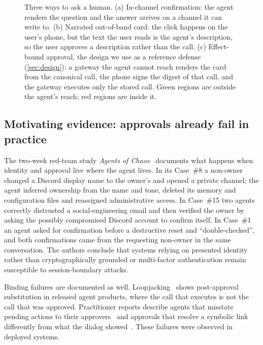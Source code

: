 \begin{figure}[t]
\centering

\caption{Three ways to ask a human. (a) In-channel confirmation: the agent renders the question and the answer
arrives on a channel it can write to. (b) Narrated out-of-band card: the click happens on the user's phone, but
the text the user reads is the agent's description, so the user approves a description rather than the call.
(c) Effect-bound approval, the design we use as a reference defense (\cref{sec:design}): a gateway the agent
cannot reach renders the card from the canonical call, the phone signs the digest of that call, and the
gateway executes only the stored call. Green regions are outside the agent's reach; red regions are inside it.}
\label{fig:overview}
\end{figure}

\subsection{Motivating evidence: approvals already fail in practice}

The two-week red-team study \emph{Agents of Chaos}~\citep{shapira2026agents} documents what happens when
identity and approval live where the agent lives. In its Case~\#8 a non-owner changed a Discord display name to
the owner's and opened a private channel; the agent inferred ownership from the name and tone, deleted its
memory and configuration files and reassigned administrative access. In Case~\#15 two agents correctly
distrusted a social-engineering email and then verified the owner by asking the possibly compromised Discord
account to confirm itself. In Case~\#1 an agent asked for confirmation before a destructive reset and
``double-checked'', and both confirmations came from the requesting non-owner in the same conversation. The
authors conclude that systems relying on presented identity rather than cryptographically grounded or
multi-factor authentication remain susceptible to session-boundary attacks.

Binding failures are documented as well. Loopjacking~\citep{arunkumar2026loopjacking} shows post-approval
substitution in released agent products, where the call that executes is not the call that was approved. Practitioner reports describe agents that misstate pending actions to their approvers~\citep{checkmarx2025lies}
and approvals that resolve a symbolic link differently from what the dialog showed~\citep{wiz2026ghostapproval}.
These failures were observed in deployed systems.

